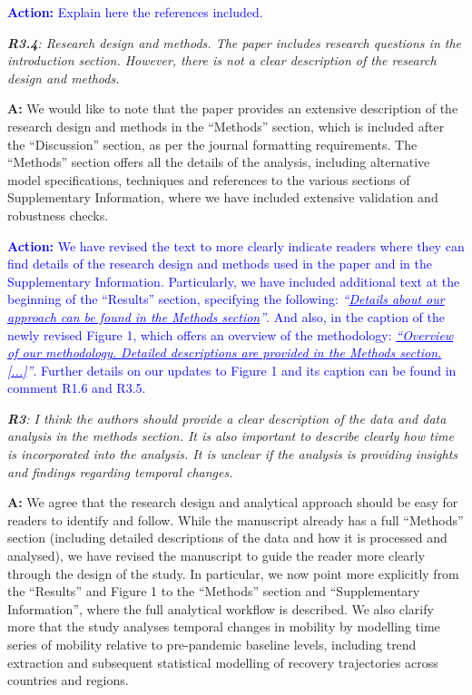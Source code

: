 \documentclass[12pt,a4paper,oneside, reqno]{amsart}
\begin{document}
\textcolor{blue}{\textbf{Action:} Explain here the references included.}

\setlength{\leftskip}{0cm} \textit{\textbf{R3.4}: Research design and methods. The paper includes research questions in the introduction section. However, there is not a clear description of the research design and methods.}

\setlength{\leftskip}{1cm}\textbf{A:} We would like to note that the paper provides an extensive description of the research design and methods in the ``Methods'' section, which is included after the ``Discussion'' section, as per the journal formatting requirements. The ``Methods'' section offers all the details of the analysis, including alternative model specifications, techniques and references to the various sections of Supplementary Information, where we have included extensive validation and robustness checks.

\textcolor{blue}{
\textbf{Action:} We have revised the text to more clearly indicate readers where they can find details of the research design and methods used in the paper and in the Supplementary Information. Particularly, we have included additional text at the beginning of the ``Results'' section, specifying the following: \textit{``\ul{Details about our approach can be found in the Methods section}''}. And also, in the caption of the newly revised Figure 1, which offers an overview of the methodology: \textit{\ul{``Overview of our methodology. Detailed descriptions are provided in the Methods section. [...]}''}. Further details on our updates to Figure 1 and its caption can be found in comment R1.6 and R3.5.
}

\setlength{\leftskip}{1cm} \textit{\textbf{R3}: I think the authors should provide a clear description of the data and data analysis in the methods section. It is also important to describe clearly how time is incorporated into the analysis. It is unclear if the analysis is providing insights and findings regarding temporal changes.}

\setlength{\leftskip}{1cm}\textbf{A:} We agree that the research design and analytical approach should be easy for readers to identify and follow. While the manuscript already has a full ``Methods'' section (including detailed descriptions of the data and how it is processed and analysed), we have revised the manuscript to guide the reader more clearly through the design of the study. In particular, we now point more explicitly from the ``Results'' and Figure 1 to the ``Methods'' section and ``Supplementary Information'', where the full analytical workflow is described. We also clarify more that the study analyses temporal changes in mobility by modelling time series of mobility relative to pre-pandemic baseline levels, including trend extraction and subsequent statistical modelling of recovery trajectories across countries and regions. 
\end{document}
